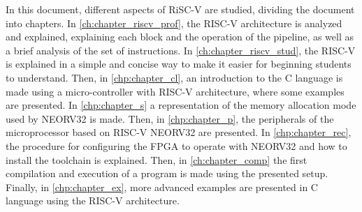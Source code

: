 In this document, different aspects of RiSC-V are studied, dividing the document into chapters. In \autoref{ch:chapter_riscv_prof}, the RISC-V architecture is analyzed and explained, explaining each block and the operation of the pipeline, as well as a brief analysis of the set of instructions. In \autoref{ch:chapter_riscv_stud}, the RISC-V is explained in a simple and concise way to make it easier for beginning students to understand. Then, in \autoref{chp:chapter_cl}, an introduction to the C language is made using a micro-controller with RISC-V architecture, where some examples are presented. In \autoref{chp:chapter_s} a representation of the memory allocation mode used by NEORV32 is made. Then, in \autoref{chp:chapter_p}, the peripherals of the microprocessor based on RISC-V NEORV32 are presented. In \autoref{chp:chapter_rec}, the procedure for configuring the FPGA to operate with NEORV32 and how to install the toolchain is explained. Then, in \autoref{ch:chapter_comp} the first compilation and execution of a program is made using the presented setup. Finally, in \autoref{chp:chapter_ex}, more advanced examples are presented in C language using the RISC-V architecture.



